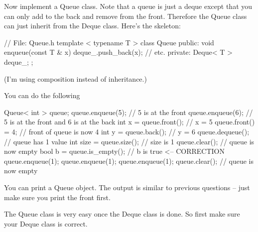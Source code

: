 Now implement a Queue class.
Note that a queue is just a deque except that 
you can only add to the back and remove from the front.
Therefore the Queue class can just inherit from the Deque class.
Here's the skeleton:
\begin{console}[fontsize=\footnotesize]
// File: Queue.h
template < typename T >
class Queue
{
public:
    void enqueue(const T & x)
    {
        deque_.push_back(x);
    }
// etc.
private:
    Deque< T > deque_;
};
\end{console}
(I'm using composition instead of inheritance.)

You can do the following
\begin{console}[fontsize=\footnotesize]
Queue< int > queue;
queue.enqueue(5);          // 5 is at the front 
queue.enqueue(6);          // 5 is at the front and 6 is at the back 
int x = queue.front();     // x = 5
queue.front() = 4;         // front of queue is now 4
int y = queue.back();      // y = 6
queue.dequeue();           // queue has 1 value
int size = queue.size();   // size is 1
queue.clear();             // queue is now empty
bool b = queue.is_empty(); // b is true           <-- CORRECTION
queue.enqueue(1);
queue.enqueue(1);
queue.enqueue(1);
queue.clear();             // queue is now empty
\end{console}

You can print a Queue object.
The output is similar to previous questions -- just 
make sure you print the front first.

The Queue class is very easy once the Deque class is done.
So first make sure your Deque class is correct.
